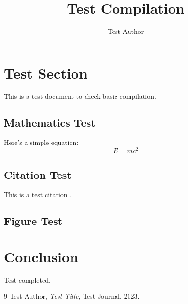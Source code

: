 \documentclass[11pt]{article}
\title{Test Compilation}
\author{Test Author}
\begin{document}
\maketitle

\section{Test Section}

This is a test document to check basic compilation.

\subsection{Mathematics Test}

Here's a simple equation:
\begin{equation}
E = mc^2
\end{equation}

\subsection{Citation Test}

This is a test citation \citep{test2023}.

\subsection{Figure Test}


\section{Conclusion}

Test completed.

\begin{thebibliography}{9}
Test Author,
\textit{Test Title},
Test Journal, 2023.
\end{thebibliography}
\end{document}
